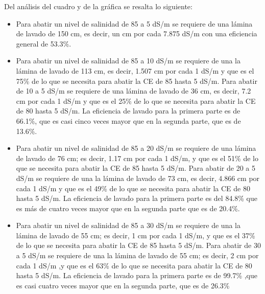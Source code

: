 Del análisis del cuadro y de la gráfica se resalta lo siguiente:
\begin{itemize}
    \item Para abatir un nivel de salinidad de 85 a 5 dS/m se requiere de una lámina de lavado de 150 cm, es decir, un cm por cada 7.875 dS/m con una eficiencia general de 53.3\%.
    \item Para abatir un nivel de salinidad de 85 a 10 dS/m se requiere de una la lámina de lavado de 113 cm, es decir, 1.507 cm por cada 1 dS/m y que es el 75\% de lo que se necesita para abatir la CE de 85 hasta 5 dS/m. Para abatir de 10 a 5 dS/m se requiere de una lámina de lavado de 36 cm, es decir, 7.2 cm por cada 1 dS/m y que es el 25\% de lo que se necesita para abatir la CE de 80 hasta 5 dS/m. La eficiencia de lavado para la primera parte es de 66.1\%, que es casi cinco veces mayor que en la segunda parte, que es de 13.6\%.
    \item Para abatir un nivel de salinidad de 85 a 20 dS/m se requiere de una lámina de lavado de 76 cm; es decir, 1.17 cm por cada 1 dS/m, y que es el 51\% de lo que se necesita para abatir la CE de 85 hasta 5 dS/m. Para abatir de 20 a 5 dS/m se requiere de una la lámina de lavado de 73 cm, es decir, 4.866 cm por cada 1 dS/m y que es el 49\% de lo que se necesita para abatir la CE de 80 hasta 5 dS/m. La eficiencia de lavado para la primera parte es del 84.8\% que es más de cuatro veces mayor que en la segunda parte que es de 20.4\%.
    \item Para abatir un nivel de salinidad de 85 a 30 dS/m se requiere de una la lámina de lavado de 55 cm; es decir, 1 cm por cada 1 dS/m, y que es el 37\% de lo que se necesita para abatir la CE de 85 hasta 5 dS/m. Para abatir de 30 a 5 dS/m se requiere de una la lámina de lavado de 55 cm; es decir, 2 cm por cada 1 dS/m ,y que es el 63\% de lo que se necesita para abatir la CE de 80 hasta 5 dS/m. La eficiencia de lavado para la primera parte es de 99.7\% ,que es casi cuatro veces mayor que en la segunda parte, que es de 26.3\%
\end{itemize}

